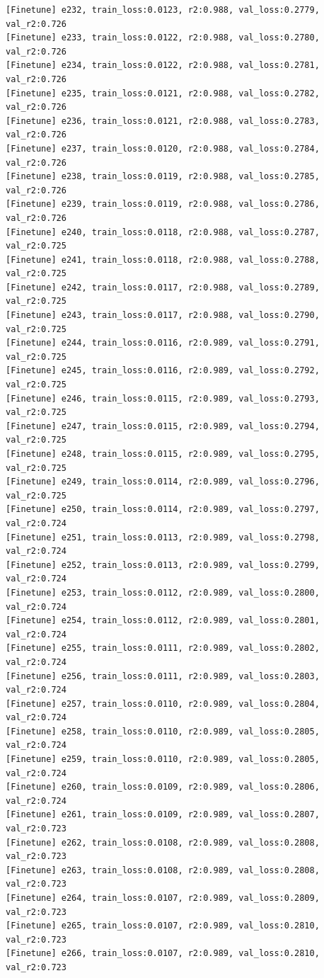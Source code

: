 \documentclass[a4paper, 12pt]{article}
\begin{document}
\begin{lstlisting}
[Finetune] e232, train_loss:0.0123, r2:0.988, val_loss:0.2779, val_r2:0.726
[Finetune] e233, train_loss:0.0122, r2:0.988, val_loss:0.2780, val_r2:0.726
[Finetune] e234, train_loss:0.0122, r2:0.988, val_loss:0.2781, val_r2:0.726
[Finetune] e235, train_loss:0.0121, r2:0.988, val_loss:0.2782, val_r2:0.726
[Finetune] e236, train_loss:0.0121, r2:0.988, val_loss:0.2783, val_r2:0.726
[Finetune] e237, train_loss:0.0120, r2:0.988, val_loss:0.2784, val_r2:0.726
[Finetune] e238, train_loss:0.0119, r2:0.988, val_loss:0.2785, val_r2:0.726
[Finetune] e239, train_loss:0.0119, r2:0.988, val_loss:0.2786, val_r2:0.726
[Finetune] e240, train_loss:0.0118, r2:0.988, val_loss:0.2787, val_r2:0.725
[Finetune] e241, train_loss:0.0118, r2:0.988, val_loss:0.2788, val_r2:0.725
[Finetune] e242, train_loss:0.0117, r2:0.988, val_loss:0.2789, val_r2:0.725
[Finetune] e243, train_loss:0.0117, r2:0.988, val_loss:0.2790, val_r2:0.725
[Finetune] e244, train_loss:0.0116, r2:0.989, val_loss:0.2791, val_r2:0.725
[Finetune] e245, train_loss:0.0116, r2:0.989, val_loss:0.2792, val_r2:0.725
[Finetune] e246, train_loss:0.0115, r2:0.989, val_loss:0.2793, val_r2:0.725
[Finetune] e247, train_loss:0.0115, r2:0.989, val_loss:0.2794, val_r2:0.725
[Finetune] e248, train_loss:0.0115, r2:0.989, val_loss:0.2795, val_r2:0.725
[Finetune] e249, train_loss:0.0114, r2:0.989, val_loss:0.2796, val_r2:0.725
[Finetune] e250, train_loss:0.0114, r2:0.989, val_loss:0.2797, val_r2:0.724
[Finetune] e251, train_loss:0.0113, r2:0.989, val_loss:0.2798, val_r2:0.724
[Finetune] e252, train_loss:0.0113, r2:0.989, val_loss:0.2799, val_r2:0.724
[Finetune] e253, train_loss:0.0112, r2:0.989, val_loss:0.2800, val_r2:0.724
[Finetune] e254, train_loss:0.0112, r2:0.989, val_loss:0.2801, val_r2:0.724
[Finetune] e255, train_loss:0.0111, r2:0.989, val_loss:0.2802, val_r2:0.724
[Finetune] e256, train_loss:0.0111, r2:0.989, val_loss:0.2803, val_r2:0.724
[Finetune] e257, train_loss:0.0110, r2:0.989, val_loss:0.2804, val_r2:0.724
[Finetune] e258, train_loss:0.0110, r2:0.989, val_loss:0.2805, val_r2:0.724
[Finetune] e259, train_loss:0.0110, r2:0.989, val_loss:0.2805, val_r2:0.724
[Finetune] e260, train_loss:0.0109, r2:0.989, val_loss:0.2806, val_r2:0.724
[Finetune] e261, train_loss:0.0109, r2:0.989, val_loss:0.2807, val_r2:0.723
[Finetune] e262, train_loss:0.0108, r2:0.989, val_loss:0.2808, val_r2:0.723
[Finetune] e263, train_loss:0.0108, r2:0.989, val_loss:0.2808, val_r2:0.723
[Finetune] e264, train_loss:0.0107, r2:0.989, val_loss:0.2809, val_r2:0.723
[Finetune] e265, train_loss:0.0107, r2:0.989, val_loss:0.2810, val_r2:0.723
[Finetune] e266, train_loss:0.0107, r2:0.989, val_loss:0.2810, val_r2:0.723

\end{lstlisting}
\end{document}
